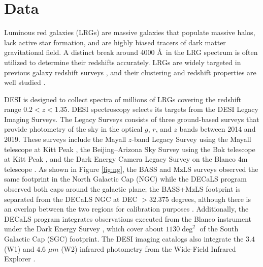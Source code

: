 \section{Data}
\label{sec:data}

Luminous red galaxies (LRGs) are massive galaxies that populate massive halos, lack active star formation, and are highly biased tracers of dark matter gravitational field. A distinct break around 4000 \AA~in the LRG spectrum is often utilized to determine their redshifts accurately. LRGs are widely targeted in previous galaxy redshift surveys \citep[see, e.g.,][]{eisenstein2001spectroscopic, prakash2016sdss}, and their clustering and redshift properties are well studied \citep[see, e.g.,][]{ross2020MNRAS.498.2354R, gilmarin2020MNRAS.498.2492G, bautista2021MNRAS.500..736B, chapman2022MNRAS.516..617C}. 

DESI is designed to collect spectra of millions of LRGs covering the redshift range $0.2<z<1.35$. DESI spectroscopy selects its targets from the DESI Legacy Imaging Surveys. The Legacy Surveys consists of three ground-based surveys that provide photometry of the sky in the optical $g$, $r$, and $z$ bands between 2014 and 2019. These surveys include the Mayall $z$-band Legacy Survey using the Mayall telescope at Kitt Peak \citep[MzLS;][]{dey2018overview}, the Beijing–Arizona Sky Survey using the Bok telescope at Kitt Peak \citep[BASS;][]{zou2017project}, and the Dark Energy Camera Legacy Survey on the Blanco 4m telescope \citep[DECaLS][]{flaugher2015dark}. As shown in Figure \ref{fig:ng}, the BASS and MzLS surveys observed the same footprint in the North Galactic Cap (NGC) while the DECaLS program observed both caps around the galactic plane; the BASS+MzLS footprint is separated from the DECaLS NGC at DEC $> 32.375$ degrees, although there is an overlap between the two regions for calibration purposes \citep{dey2018overview}. Additionally, the DECaLS program integrates observations executed from the Blanco instrument under the Dark Energy Survey \citep{abbott2016dark}, which cover about $1130 \deg^{2}$ of the South Galactic Cap (SGC) footprint. The DESI imaging catalogs also integrate the $3.4$ (W1) and $4.6$ $\mu m$ (W2) infrared photometry from the Wide-Field Infrared Explorer \citep[WISE;][]{wise2010AJ....140.1868W, meisner2018RNAAS...2....1M}.  

